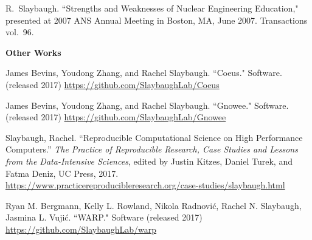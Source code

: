 \begin{bibsection}
\item R.\ Slaybaugh. ``Strengths and Weaknesses of Nuclear Engineering Education," presented at 2007 ANS Annual Meeting in Boston, MA, June 2007. Transactions vol.\ 96.


\item \textbf{Other Works}
\item James Bevins, Youdong Zhang, and Rachel Slaybaugh. ``Coeus." Software. (released 2017) \url{https://github.com/SlaybaughLab/Coeus} 

\item James Bevins, Youdong Zhang, and Rachel Slaybaugh. ``Gnowee." Software. (released 2017) \url{https://github.com/SlaybaughLab/Gnowee} 

\item Slaybaugh, Rachel. ``Reproducible Computational Science on High Performance Computers.'' \textit{The Practice of Reproducible Research, Case Studies and Lessons from the Data-Intensive Sciences}, edited by Justin Kitzes, Daniel Turek, and Fatma Deniz, UC Press, 2017. \\ \url{https://www.practicereproducibleresearch.org/case-studies/slaybaugh.html}

\item Ryan M. Bergmann, Kelly L. Rowland, Nikola Radnovi\'c, Rachel N. Slaybaugh, Jasmina L. Vuji\'c. ``WARP." Software (released 2017) \url{https://github.com/SlaybaughLab/warp}

\end{bibsection}

